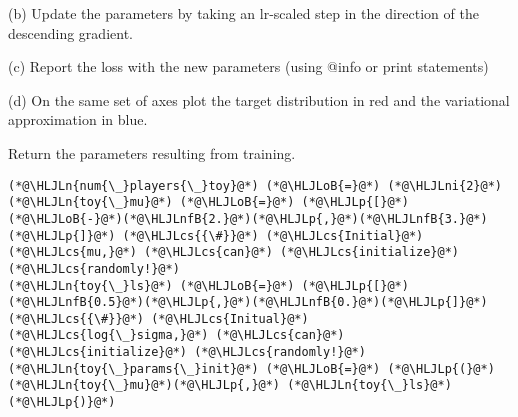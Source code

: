 \documentclass[12pt,a4paper]{article}
\newcommand{\HLJLn}[1]{#1}
\newcommand{\HLJLnfB}[1]{\textcolor[RGB]{59,151,46}{#1}}
\newcommand{\HLJLni}[1]{\textcolor[RGB]{59,151,46}{#1}}
\newcommand{\HLJLoB}[1]{\textcolor[RGB]{102,102,102}{\textbf{#1}}}
\newcommand{\HLJLp}[1]{#1}
\newcommand{\HLJLcs}[1]{\textcolor[RGB]{153,153,119}{\textit{#1}}}
\begin{document}
(b)  Update the parameters by taking an lr-scaled step in the direction of the descending gradient.

(c)  Report the loss with the new parameters (using @info or print statements)

(d)  On the same set of axes plot the target distribution in red and the variational approximation in blue.

Return the parameters resulting from training.


\begin{lstlisting}
(*@\HLJLn{num{\_}players{\_}toy}@*) (*@\HLJLoB{=}@*) (*@\HLJLni{2}@*)
(*@\HLJLn{toy{\_}mu}@*) (*@\HLJLoB{=}@*) (*@\HLJLp{[}@*)(*@\HLJLoB{-}@*)(*@\HLJLnfB{2.}@*)(*@\HLJLp{,}@*)(*@\HLJLnfB{3.}@*)(*@\HLJLp{]}@*) (*@\HLJLcs{{\#}}@*) (*@\HLJLcs{Initial}@*) (*@\HLJLcs{mu,}@*) (*@\HLJLcs{can}@*) (*@\HLJLcs{initialize}@*) (*@\HLJLcs{randomly!}@*)
(*@\HLJLn{toy{\_}ls}@*) (*@\HLJLoB{=}@*) (*@\HLJLp{[}@*)(*@\HLJLnfB{0.5}@*)(*@\HLJLp{,}@*)(*@\HLJLnfB{0.}@*)(*@\HLJLp{]}@*) (*@\HLJLcs{{\#}}@*) (*@\HLJLcs{Initual}@*) (*@\HLJLcs{log{\_}sigma,}@*) (*@\HLJLcs{can}@*) (*@\HLJLcs{initialize}@*) (*@\HLJLcs{randomly!}@*)
(*@\HLJLn{toy{\_}params{\_}init}@*) (*@\HLJLoB{=}@*) (*@\HLJLp{(}@*)(*@\HLJLn{toy{\_}mu}@*)(*@\HLJLp{,}@*) (*@\HLJLn{toy{\_}ls}@*)(*@\HLJLp{)}@*)


\end{lstlisting}
\end{document}
